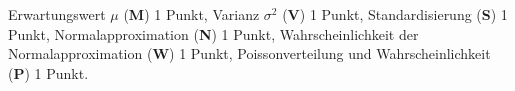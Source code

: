 \begin{bewertung}
Erwartungswert $\mu$ ({\bf M}) 1 Punkt,
Varianz $\sigma^2$ ({\bf V}) 1 Punkt,
Standardisierung ({\bf S}) 1 Punkt,
Normalapproximation ({\bf N}) 1 Punkt,
Wahrscheinlichkeit der Normalapproximation ({\bf W}) 1 Punkt,
Poissonverteilung und Wahrscheinlichkeit ({\bf P}) 1 Punkt.
\end{bewertung}



